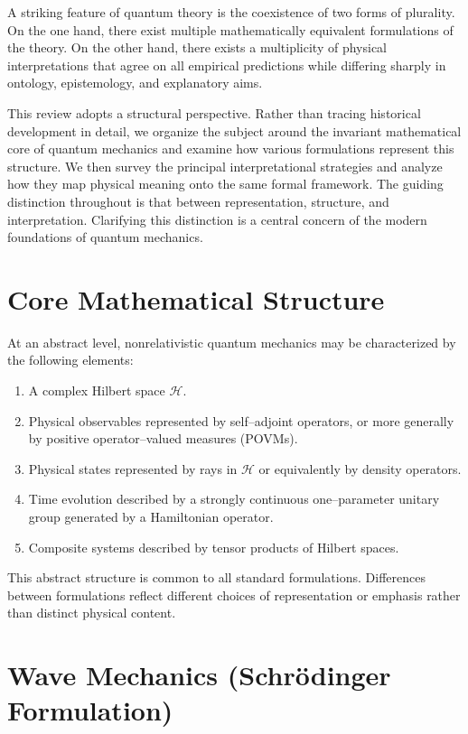 \documentclass[11pt]{article}
\begin{document}
A striking feature of quantum theory is the coexistence of two forms of plurality. On the one hand, there exist multiple mathematically equivalent formulations of the theory. On the other hand, there exists a multiplicity of physical interpretations that agree on all empirical predictions while differing sharply in ontology, epistemology, and explanatory aims.

This review adopts a structural perspective. Rather than tracing historical development in detail, we organize the subject around the invariant mathematical core of quantum mechanics and examine how various formulations represent this structure. We then survey the principal interpretational strategies and analyze how they map physical meaning onto the same formal framework. The guiding distinction throughout is that between representation, structure, and interpretation.
Clarifying this distinction is a central concern of the modern foundations of quantum mechanics.

\section{Core Mathematical Structure}

At an abstract level, nonrelativistic quantum mechanics may be characterized by the following elements:

\begin{enumerate}
\item A complex Hilbert space $\mathcal{H}$.
\item Physical observables represented by self--adjoint operators, or more generally by positive operator--valued measures (POVMs).
\item Physical states represented by rays in $\mathcal{H}$ or equivalently by density operators.
\item Time evolution described by a strongly continuous one--parameter unitary group generated by a Hamiltonian operator.
\item Composite systems described by tensor products of Hilbert spaces.
\end{enumerate}

This abstract structure is common to all standard formulations. Differences between formulations reflect different choices of representation or emphasis rather than distinct physical content.

\section{Wave Mechanics (Schrödinger Formulation)}
\end{document}
